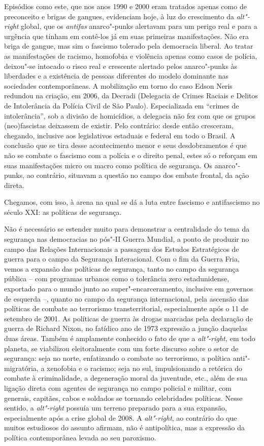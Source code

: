 Episódios como este, que nos anos 1990 e 2000 eram tratados apenas como
de preconceito e brigas de gangues, evidenciam hoje, à luz do
crescimento da \emph{alt"-right} global, que os \emph{antifas}
anarco"-punks alertavam para um perigo real e para a urgência que tinham
em contê-los já em suas primeiras manifestações. Não era briga de
gangue, mas sim o fascismo tolerado pela democracia liberal. Ao tratar
as manifestações de racismo, homofobia e violência apenas como casos de
polícia, deixou"-se intocado o risco real e crescente alertado pelos
anarco"-punks às liberdades e a existência de pessoas diferentes do
modelo dominante nas sociedades contemporâneas. A mobilização em torno
do caso Edson Neris redundou na criação, em 2006, da Decradi (Delegacia
de Crimes Raciais e Delitos de Intolerância da Polícia Civil de São
Paulo). Especializada em ``crimes de intolerância'', sob a divisão de
homicídios, a delegacia não fez com que os grupos (neo)fascistas
deixassem de existir. Pelo contrário: desde então cresceram, chegando,
inclusive aos legislativos estaduais e federal em todo o Brasil. A
conclusão que se tira desse acontecimento menor e seus desdobramentos é
que não se combate o fascismo com a polícia e o direito penal, estes só
o reforçam em suas manifestações micro ou macro como política de
segurança. Os anarco"-punks, ao contrário, situavam a questão no campo
dos embate frontal, da ação direta.

Chegamos, com isso, à arena na qual se dá a luta entre fascismo e
antifascismo no século XXI: as políticas de segurança.

Não é necessário se estender muito para demonstrar a centralidade do
tema da segurança nas democracias no pós"-II Guerra Mundial, a ponto de
produzir no campo das Relações Internacionais a passagem dos Estudos
Estratégicos de guerra para o campo da Segurança Interacional. Com o fim
da Guerra Fria, vemos a expansão das políticas de segurança, tanto no
campo da segurança pública -- com programas urbanos como o tolerância
zero estadunidense, exportado para o mundo junto ao
super"-encarceramento, inclusive em governos de esquerda --, quanto no
campo da segurança internacional, pela ascensão das políticas de combate
ao terrorismo transterritorial, especialmente após o 11 de setembro de
2001. As políticas de guerra às drogas marcadas pela declaração de
guerra de Richard Nixon, no fatídico ano de 1973 expressão a junção
daquelas duas áreas. Também é amplamente conhecido o fato de que a
\emph{alt"-right,} em todo planeta, se viabilizou eleitoralmente com um
forte discurso sobre o setor de segurança: seja no norte, enfatizando o
combate ao terrorismo, a política anti"-migratória, a xenofobia e o
racismo; seja no sul, impulsionando a retórica do combate à
criminalidade, a degeneração moral da juventude, etc., além de sua
ligação direta com agentes de segurança no campo policial e militar, com
generais, capitães, cabos e soldados se tornando celebridades políticas.
Nesse sentido, a \emph{alt"-right} possuía um terreno preparado para a
sua expansão, especialmente após a crise global de 2008. A
\emph{alt"-right}, ao contrário do que muitos estudiosos do assunto
afirmam, não é antipolítica, mas a expressão da política contemporânea
levada ao seu paroxismo.

